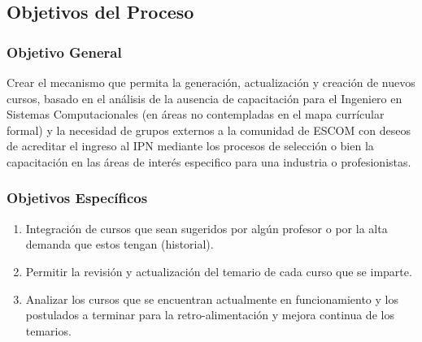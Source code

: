 
\subsection{Objetivos del Proceso} 	%

\subsubsection{Objetivo General}	%
	Crear el mecanismo que permita la generación, actualización y creación de nuevos cursos, basado en el análisis de la ausencia de capacitación para el Ingeniero en Sistemas Computacionales (en áreas no contempladas en el mapa currícular formal) y  la necesidad de grupos externos a la comunidad de ESCOM con deseos de acreditar el ingreso al IPN mediante los procesos de selección o bien la capacitación en las áreas de interés especifico para una industria o profesionistas. 
\subsubsection{Objetivos Específicos}	%
\begin{enumerate}[I] 			%
	\item Integración de cursos que sean sugeridos por algún profesor o por la alta demanda que estos tengan (historial).
	\item Permitir la revisión y actualización del temario de cada curso que se imparte. 
	\item Analizar los cursos que se encuentran actualmente en funcionamiento y los postulados a terminar para la retro-alimentación y
	mejora continua de los temarios. 
\end{enumerate}

